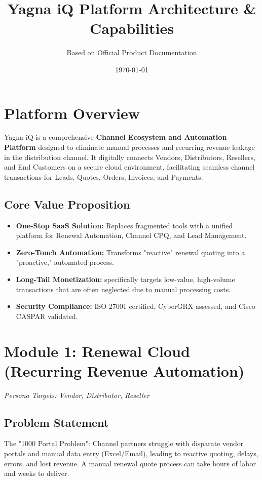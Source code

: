 \documentclass[12pt,a4paper]{article}
\title{\textbf{Yagna iQ Platform Architecture \& Capabilities}}
\author{Based on Official Product Documentation}
\date{\today}
\begin{document}
\maketitle

\section{Platform Overview}
Yagna iQ is a comprehensive \textbf{Channel Ecosystem and Automation Platform} designed to eliminate manual processes and recurring revenue leakage in the distribution channel. It digitally connects Vendors, Distributors, Resellers, and End Customers on a secure cloud environment, facilitating seamless channel transactions for Leads, Quotes, Orders, Invoices, and Payments.

\subsection{Core Value Proposition}
\begin{itemize}
    \item \textbf{One-Stop SaaS Solution:} Replaces fragmented tools with a unified platform for Renewal Automation, Channel CPQ, and Lead Management.
    \item \textbf{Zero-Touch Automation:} Transforms "reactive" renewal quoting into a "proactive," automated process.
    \item \textbf{Long-Tail Monetization:} specifically targets low-value, high-volume transactions that are often neglected due to manual processing costs.
    \item \textbf{Security Compliance:} ISO 27001 certified, CyberGRX assessed, and Cisco CASPAR validated.
\end{itemize}

\section{Module 1: Renewal Cloud (Recurring Revenue Automation)}
\textit{Persona Targets: Vendor, Distributor, Reseller}

\subsection{Problem Statement}
The "1000 Portal Problem": Channel partners struggle with disparate vendor portals and manual data entry (Excel/Email), leading to reactive quoting, delays, errors, and lost revenue. A manual renewal quote process can take hours of labor and weeks to deliver.
\end{document}
